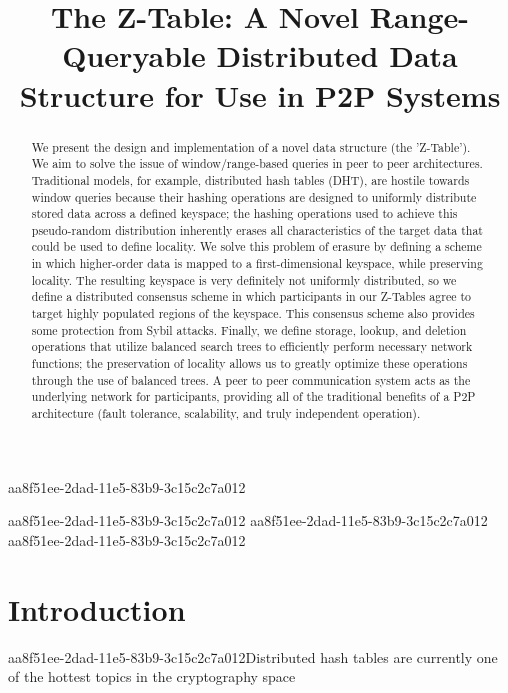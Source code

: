 \documentclass[12pt]{article}
\title{The Z-Table: A Novel Range-Queryable Distributed Data Structure for Use in P2P Systems}
\begin{document}
\maketitle
aa8f51ee-2dad-11e5-83b9-3c15c2c7a012
\begin{abstract}
We present the design and implementation of a novel data structure (the 'Z-Table'). We aim to solve the issue of window/range-based queries in peer to peer architectures. Traditional models, for example,  distributed hash tables (DHT), are hostile towards window queries because their hashing operations are designed to uniformly distribute stored data across a defined keyspace; the hashing operations used to achieve this pseudo-random distribution inherently erases all characteristics of the target data that could be used to define locality. We solve this problem of erasure by defining a scheme in which higher-order data is mapped to a first-dimensional keyspace, while preserving locality. The resulting keyspace is very definitely not uniformly distributed, so we define a distributed consensus scheme in which participants in our Z-Tables agree to target highly populated regions of the keyspace. This consensus scheme also provides some protection from Sybil attacks. Finally, we define storage, lookup, and deletion operations that utilize balanced search trees to efficiently perform necessary network functions; the preservation of locality allows us to greatly optimize these operations through the use of balanced trees. A peer to peer communication system acts as the underlying network for participants, providing all of the traditional benefits of a P2P architecture (fault tolerance, scalability, and truly independent operation).
\end{abstract}
aa8f51ee-2dad-11e5-83b9-3c15c2c7a012
aa8f51ee-2dad-11e5-83b9-3c15c2c7a012
\newpage
aa8f51ee-2dad-11e5-83b9-3c15c2c7a012\section{Introduction}
aa8f51ee-2dad-11e5-83b9-3c15c2c7a012Distributed hash tables are currently one of the hottest topics in the cryptography space~\cite{Stoica:2001dj,Rowstron:2001ea,Ratnasamy:2001wn}

\printbibliography
\end{document}
